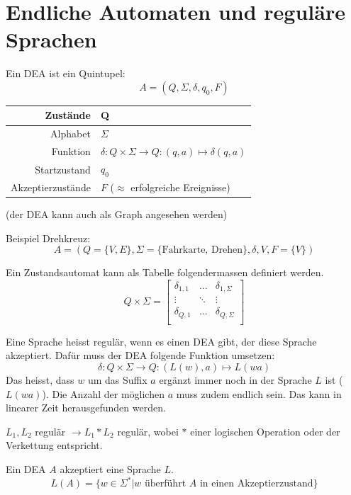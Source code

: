 \documentclass[a4paper]{article}
\begin{document}
\newpage
\section{Endliche Automaten und reguläre Sprachen}
	\begin{multicols}{2}

	\begin{fdef}
		Ein DEA ist ein Quintupel: 
		$$A = (Q, \Sigma , \delta , q_0, F)$$
		\begin{tabular}{r|l}
		Zustände & Q \\\hline
		Alphabet & $\Sigma$ \\\hline
		Funktion & $\delta: Q \times \Sigma \rightarrow Q: (q,a) \mapsto \delta(q,a)$ \\\hline
		Startzustand & $q_0$ \\\hline
		Akzeptierzustände & $F$ ($\approx$ erfolgreiche Ereignisse)
		\end{tabular}
		(der DEA kann auch als Graph angesehen werden)
	\end{fdef}

	Beispiel Drehkreuz:
	$$A = (Q = \{V,E\}, \Sigma = \{\text{Fahrkarte, Drehen}\}, \delta, V, F = \{V\})$$
	
	\begin{fdef}[Tabellenform]
	Ein Zustandsautomat kann als Tabelle folgendermassen definiert werden. 
	$$Q \times \Sigma = \left[ \begin{array}{cccc}
                          \delta_{1,1} & \dots & \delta_{1,\Sigma} \\
                          \vdots & \ddots & \vdots\\
                          \delta_{Q,1} & \dots & \delta_{Q,\Sigma} \\
                        \end{array} \right]$$
	\end{fdef}
	
	\begin{fsatz}
	Eine Sprache heisst regulär, wenn es einen DEA gibt, der diese Sprache akzeptiert.
	Dafür muss der DEA folgende Funktion umsetzen: 
	$$\delta: Q\times \Sigma \rightarrow Q:(L(w), a) \mapsto L(wa)$$
	Das heisst, dass $w$ um das Suffix $a$ ergänzt immer noch in der Sprache $L$ ist ($L(wa)$). Die Anzahl der möglichen $a$ muss zudem endlich sein. Das kann in linearer Zeit herausgefunden werden.
	\end{fsatz}

	\begin{fsatz} \label{reglangop}
	$L_1, L_2$ regulär $\rightarrow L_1 * L_2$ regulär, wobei $*$ einer logischen Operation oder der Verkettung entspricht.
	\end{fsatz}

	\begin{fmerke}
	Ein DEA $A$ akzeptiert eine Sprache $L$.
	$$L(A) = \{ w \in \Sigma^* | w \text{ überführt } A \text{ in einen Akzeptierzustand} \}$$
	\end{fmerke}

	\end{multicols}	
	
\end{document}
